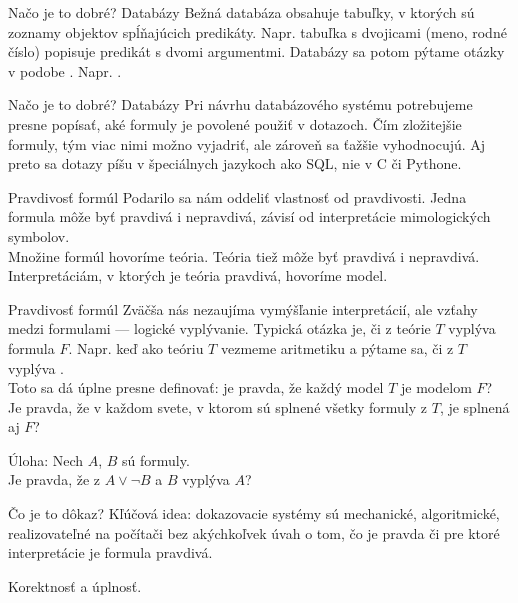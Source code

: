 \documentclass[12pt]{beamer}
\theoremstyle{definition}
\begin{document}
\begin{frame}{Načo je to dobré? Databázy}
Bežná databáza obsahuje tabuľky, v ktorých sú zoznamy objektov spĺňajúcich predikáty.
Napr. tabuľka s dvojicami (meno, rodné číslo) popisuje predikát s dvomi argumentmi.
Databázy sa potom pýtame otázky v podobe .
Napr. .
\end{frame}

\begin{frame}{Načo je to dobré? Databázy}
Pri návrhu databázového systému potrebujeme presne popísať, aké formuly je povolené použiť v dotazoch.
Čím zložitejšie formuly, tým viac nimi možno vyjadriť, ale zároveň sa ťažšie vyhodnocujú.
Aj preto sa dotazy píšu v špeciálnych jazykoch ako SQL, nie v C či Pythone.
\end{frame}


\begin{frame}{Pravdivosť formúl}
Podarilo sa nám oddeliť vlastnosť  od pravdivosti.
Jedna formula môže byť pravdivá i nepravdivá, závisí od interpretácie mimologických symbolov.\\[3mm]

Množine formúl hovoríme teória. Teória tiež môže byť pravdivá i nepravdivá.
Interpretáciám, v ktorých je teória pravdivá, hovoríme model.
\end{frame}

\begin{frame}{Pravdivosť formúl}
Zväčša nás nezaujíma vymýšľanie interpretácií, ale vzťahy medzi formulami
--- logické vyplývanie.
Typická otázka je, či z teórie $T$ vyplýva formula $F$.
Napr. keď ako teóriu $T$ vezmeme aritmetiku a pýtame sa, či z $T$ vyplýva .\\[2mm]

Toto sa dá úplne presne definovať: je pravda, že každý model $T$ je modelom $F$?\\
\alert{Je pravda, že v každom svete, v ktorom sú splnené všetky formuly z $T$, je splnená aj $F$?}
\end{frame}

\begin{frame}
Úloha: Nech $A$, $B$ sú formuly.\\
Je pravda, že z $A \lor\lnot B$ a $B$ vyplýva $A$?
\end{frame}

\begin{frame}{Čo je to dôkaz?}
Kľúčová idea: dokazovacie systémy sú mechanické, algoritmické,
realizovateľné na počítači bez akýchkoľvek úvah o tom,
čo je pravda či pre ktoré interpretácie je formula pravdivá.

Korektnosť a úplnosť.
\end{frame}
\end{document}

